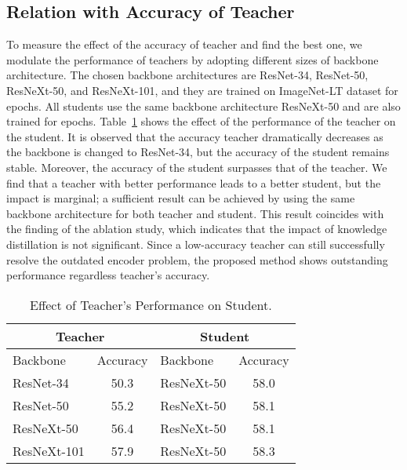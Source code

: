 \documentclass{article}
\theoremstyle{plain}
\theoremstyle{definition}
\theoremstyle{remark}
\begin{document}
\subsection{Relation with Accuracy of Teacher} \label{sec:detailed_teacher}

To measure the effect of the accuracy of teacher and find the best one, we modulate the performance of teachers by adopting different sizes of backbone architecture. The chosen backbone architectures are ResNet-34, ResNet-50, ResNeXt-50, and ResNeXt-101, and they are trained on ImageNet-LT dataset for  epochs. All students use the same backbone architecture ResNeXt-50 and are also trained for  epochs. Table~\ref{tab:teacher} shows the effect of the performance of the teacher on the student. It is observed that the accuracy teacher dramatically decreases as the backbone is changed to ResNet-34, but the accuracy of the student remains stable. Moreover, the accuracy of the student surpasses that of the teacher. We find that a teacher with better performance leads to a better student, but the impact is marginal; a sufficient result can be achieved by using the same backbone architecture for both teacher and student. This result coincides with the finding of the ablation study, which indicates that the impact of knowledge distillation is not significant. Since a low-accuracy teacher can still successfully resolve the outdated encoder problem, the proposed method shows outstanding performance regardless teacher's accuracy.



\begin{table}[t]
\centering
\caption{Effect of Teacher's Performance on Student.}
\begin{tabular}{lc|lc}
\hline
\multicolumn{2}{c|}{Teacher}                & \multicolumn{2}{c}{Student}                \\ \hline
\multicolumn{1}{l|}{Backbone}    & Accuracy & \multicolumn{1}{l|}{Backbone}   & Accuracy \\ \hline
\multicolumn{1}{l|}{ResNet-34}   & 50.3    & \multicolumn{1}{l|}{ResNeXt-50} & 58.0    \\ \hline
\multicolumn{1}{l|}{ResNet-50}   & 55.2    & \multicolumn{1}{l|}{ResNeXt-50} & 58.1    \\ \hline
\multicolumn{1}{l|}{ResNeXt-50}  & 56.4    & \multicolumn{1}{l|}{ResNeXt-50} & 58.1    \\ \hline
\multicolumn{1}{l|}{ResNeXt-101} & 57.9    & \multicolumn{1}{l|}{ResNeXt-50} & 58.3    \\ \hline
\end{tabular} \label{tab:teacher}
\end{table}
\end{document}
